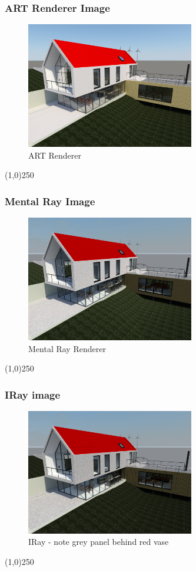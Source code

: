 \begin{frame}
\frametitle{ART Renderer Image}
\begin{figure}
	\centering
	\includegraphics[height=5.5cm]{img/Rendering/ARTRenderer.jpg}
	\caption{ART Renderer}
	\label{fig:ARTRenderer}
\end{figure}
\end{frame}
\begin{center}\line(1,0){250}\end{center}






\begin{frame}
\frametitle{Mental Ray Image}
\begin{figure}
	\centering
		\includegraphics[height=5.5cm]{img/Rendering/MentalRay.jpg}
	\caption{Mental Ray Renderer}
	\label{fig:MentalRay}
\end{figure}
\end{frame}
\begin{center}\line(1,0){250}\end{center}



\begin{frame}
\frametitle{IRay image}
\begin{figure}
	\centering
		\includegraphics[height=5.5cm]{img/Rendering/IRay.jpg}
	\caption{IRay - note grey panel behind red vase}
	\label{fig:IRay}
\end{figure}
\end{frame}
\begin{center}\line(1,0){250}\end{center}


